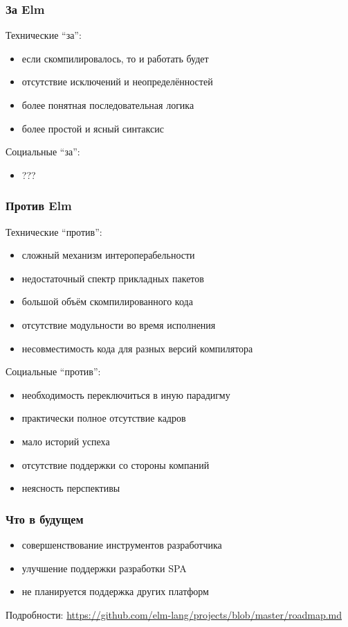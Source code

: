 \documentclass[11pt,aspectratio=169]{beamer}
\begin{document}
\begin{frame}
\frametitle{За Elm}
Технические ``за'':
\begin{itemize}
	\item если скомпилировалось, то и работать будет
	\item отсутствие исключений и неопределённостей
	\item более понятная последовательная логика
	\item более простой и ясный синтаксис
\end{itemize}

Социальные ``за'':
\begin{itemize}
	\item ???
\end{itemize}
\end{frame}

\begin{frame}
\frametitle{Против Elm}
Технические ``против'':
\begin{itemize}
	\item сложный механизм интероперабельности
	\item недостаточный спектр прикладных пакетов
	\item большой объём скомпилированного кода
	\item отсутствие модульности во время исполнения
	\item несовместимость кода для разных версий компилятора
\end{itemize}

Социальные ``против'':
\begin{itemize}
	\item необходимость переключиться в иную парадигму
	\item практически полное отсутствие кадров
	\item мало историй успеха
	\item отсутствие поддержки со стороны компаний
	\item неясность перспективы
\end{itemize}
\end{frame}

\begin{frame}
\frametitle{Что в будущем}

\begin{itemize}
	\item совершенствование инструментов разработчика
	\item улучшение поддержки разработки SPA
	\item не планируется поддержка других платформ
\end{itemize}

Подробности: \url{https://github.com/elm-lang/projects/blob/master/roadmap.md}

\end{frame}
\end{document}
